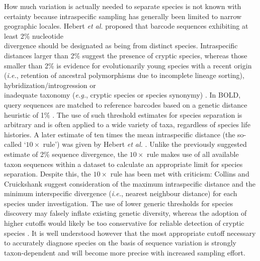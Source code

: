 How much variation is actually needed to separate species is not known with certainty because intraspecific sampling has generally been limited to narrow geographic locales. Hebert \textit{et al.} \cite{hebert2003biological} proposed that barcode sequences exhibiting at least 2\% nucleotide \\ divergence should be designated as being from distinct species. Intraspecific distances larger than 2\% suggest the presence of cryptic species, whereas those smaller than 2\% is evidence for evolutionarily young species with a recent origin (\textit{i.e.}, retention of ancestral polymorphisms due to incomplete lineage sorting), hybridization/introgression or \\ inadequate taxonomy (\textit{e.g.}, cryptic species or species synonymy) \cite{hubert2015dna}. In BOLD, query sequences are matched to reference barcodes based on a genetic distance heuristic of 1\% \cite{ratnasingham2007bold}. The use of such threshold estimates for species separation is arbitrary and is often applied to a wide variety of taxa, regardless of species life histories. A later estimate of ten times the mean intraspecific distance (the so-called `$10\times$ rule') was given by Hebert \textit{et al.} \cite{hebert2004identification}. Unlike the previously suggested estimate of 2\% sequence divergence, the $10\times$ rule makes use of all available taxon sequences within a dataset to calculate an appropriate limit for species separation. Despite this, the $10\times$ rule has been met with criticism: Collins and Cruickshank \cite{collins2013seven} suggest consideration of the maximum intraspecific distance and the minimum interspecific divergence (\textit{i.e.}, nearest neighbour distance) for each species under investigation. The use of lower generic thresholds for species discovery may falsely inflate existing genetic diversity, whereas the adoption of higher cutoffs would likely be too conservative for reliable detection of cryptic species \cite{april2011genetic}. It is well understood however that the most appropriate cutoff necessary to accurately diagnose species on the basis of sequence variation is strongly taxon-dependent \cite{hebert2003barcoding, hickerson2006dna, meyer2005dna} and will become more precise with increased sampling effort.



